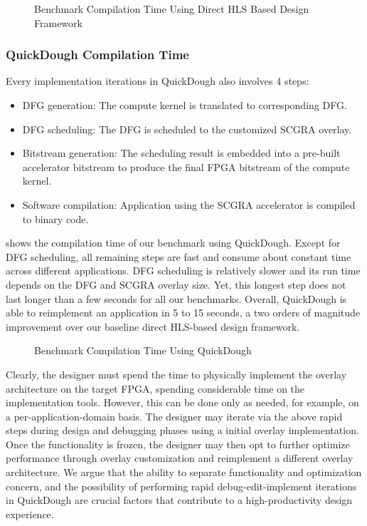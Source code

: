 \begin{figure}
\caption{Benchmark Compilation Time Using Direct HLS Based Design Framework}
\label{fig:Vivado-HLS-Compilation-Time}
\end{figure}

\subsubsection{QuickDough Compilation Time}
Every implementation iterations in QuickDough also involves 4 steps:

\begin{itemize}[label=\textbullet,leftmargin=2em,rightmargin=\leftmargin]
\item DFG generation: The compute kernel is translated to corresponding DFG.
\item DFG scheduling: The DFG is scheduled to the customized SCGRA overlay. 
\item Bitstream generation: The scheduling result is embedded into a pre-built accelerator bitstream 
to produce the final FPGA bitstream of the compute kernel.
\item Software compilation: Application using the SCGRA accelerator is compiled to binary code.
\end{itemize}



 shows the compilation time of our benchmark using QuickDough.
Except for DFG scheduling, all remaining steps are fast and consume about constant time across different applications.
DFG scheduling is relatively slower and its run time depends on the DFG and SCGRA overlay size.
Yet, this longest step does not last longer than a few seconds for all our benchmarks.
Overall, QuickDough is able to reimplement an application in 5 to 15 seconds, a two orders of magnitude improvement over our baseline direct HLS-based design framework.

\begin{figure}
\caption{Benchmark Compilation Time Using QuickDough}
\label{fig:SCGRA-Overlay-Compilation-Time}
\end{figure}


Clearly, the designer must spend the time to physically implement the overlay architecture on the target FPGA, spending considerable time on the implementation tools.
However, this can be done only as needed, for example, on a per-application-domain basis.
The designer may iterate via the above rapid steps during design and debugging phases using a initial overlay implementation.
Once the functionality is frozen, the designer may then opt to further optimize performance through overlay customization and reimplement a different overlay architecture.
We argue that the ability to separate functionality and optimization concern, and the possibility of performing rapid debug-edit-implement iterations in QuickDough are crucial factors that contribute to a high-productivity design experience.



